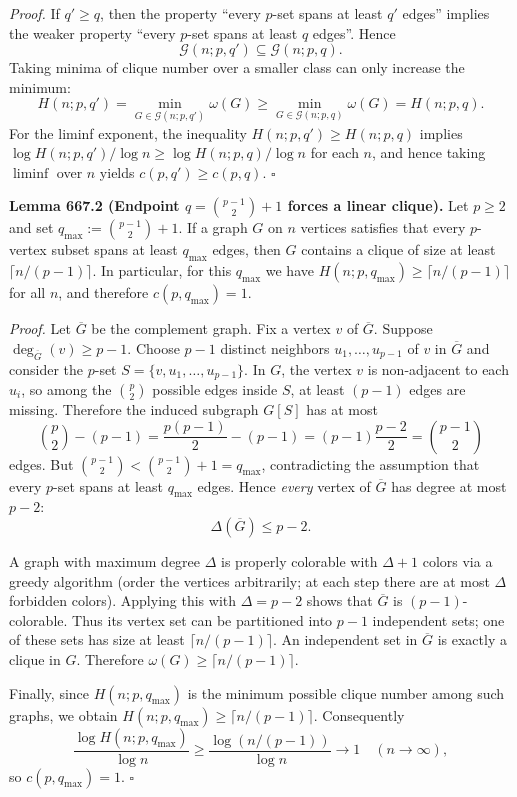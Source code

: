 \noindent\emph{Proof.}
If $q'\ge q$, then the property ``every $p$-set spans at least $q'$ edges'' implies the weaker property ``every $p$-set spans at least $q$ edges''. Hence
\[\mathcal{G}(n;p,q')\subseteq \mathcal{G}(n;p,q).\]
Taking minima of clique number over a smaller class can only increase the minimum:
\[
H(n;p,q') 
= \min_{G\in\mathcal{G}(n;p,q')} \omega(G)
\ge \min_{G\in\mathcal{G}(n;p,q)} \omega(G)
= H(n;p,q).
\]
For the liminf exponent, the inequality $H(n;p,q')\ge H(n;p,q)$ implies
\(\log H(n;p,q')/\log n\ge \log H(n;p,q)/\log n\) for each $n$, and hence taking $\liminf$ over $n$ yields $c(p,q')\ge c(p,q)$.
\hfill$\square$

\medskip
\noindent\textbf{Lemma 667.2 (Endpoint $q=\binom{p-1}{2}+1$ forces a linear clique).}
Let $p\ge 2$ and set $q_\max := \binom{p-1}{2}+1$.
If a graph $G$ on $n$ vertices satisfies that every $p$-vertex subset spans at least $q_\max$ edges, then $G$ contains a clique of size at least $\lceil n/(p-1)\rceil$.
In particular, for this $q_\max$ we have $H(n;p,q_\max)\ge \lceil n/(p-1)\rceil$ for all $n$, and therefore $c(p,q_\max)=1$.

\noindent\emph{Proof.}
Let $\overline{G}$ be the complement graph.
Fix a vertex $v$ of $\overline{G}$. Suppose $\deg_{\overline{G}}(v)\ge p-1$.
Choose $p-1$ distinct neighbors $u_1,\dots,u_{p-1}$ of $v$ in $\overline{G}$ and consider the $p$-set
$S=\{v,u_1,\dots,u_{p-1}\}$.
In $G$, the vertex $v$ is non-adjacent to each $u_i$, so among the ${p\choose 2}$ possible edges inside $S$, at least $(p-1)$ edges are missing.
Therefore the induced subgraph $G[S]$ has at most
\[
\binom{p}{2}-(p-1) 
= \frac{p(p-1)}{2}-(p-1)
= (p-1)\frac{p-2}{2}
= \binom{p-1}{2}
\]
edges.
But $\binom{p-1}{2} < \binom{p-1}{2}+1=q_\max$, contradicting the assumption that every $p$-set spans at least $q_\max$ edges.
Hence \emph{every} vertex of $\overline{G}$ has degree at most $p-2$:
\[
\Delta(\overline{G})\le p-2.
\]

A graph with maximum degree $\Delta$ is properly colorable with $\Delta+1$ colors via a greedy algorithm (order the vertices arbitrarily; at each step there are at most $\Delta$ forbidden colors).
Applying this with $\Delta=p-2$ shows that $\overline{G}$ is $(p-1)$-colorable.
Thus its vertex set can be partitioned into $p-1$ independent sets; one of these sets has size at least $\lceil n/(p-1)\rceil$.
An independent set in $\overline{G}$ is exactly a clique in $G$.
Therefore $\omega(G)\ge \lceil n/(p-1)\rceil$.

Finally, since $H(n;p,q_\max)$ is the minimum possible clique number among such graphs, we obtain $H(n;p,q_\max)\ge \lceil n/(p-1)\rceil$.
Consequently
\[
\frac{\log H(n;p,q_\max)}{\log n} \ge \frac{\log( n/(p-1))}{\log n} \to 1
\quad (n\to\infty),
\]
so $c(p,q_\max)=1$.
\hfill$\square$

